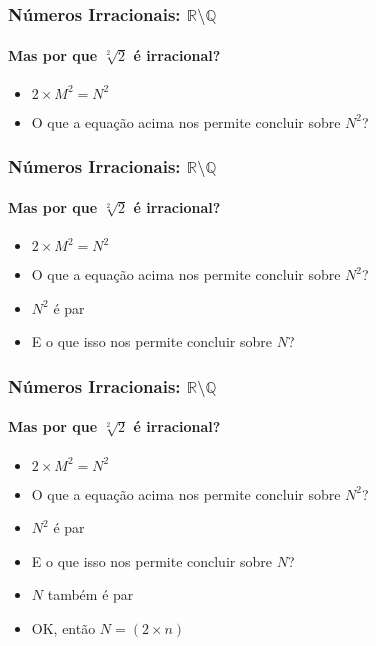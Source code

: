\documentclass[usenames,dvipsnames,svgnames]{beamer}
\begin{document}
\begin{frame}
	
	\frametitle{Números Irracionais: $\mathbb{R} \setminus \mathbb{Q}$}
	\framesubtitle{Mas {\color{red}por que} $\sqrt[2]{2}$ é irracional?}

	\begin{itemize}
		\item $2 \times M^2 = N^2$
		\item O que a equação acima nos permite concluir sobre $N^2$?
	\end{itemize}

\end{frame}

\begin{frame}
	
	\frametitle{Números Irracionais: $\mathbb{R} \setminus \mathbb{Q}$}
	\framesubtitle{Mas {\color{red}por que} $\sqrt[2]{2}$ é irracional?}

	\begin{itemize}
		\item $2 \times M^2 = N^2$
		\item O que a equação acima nos permite concluir sobre $N^2$?
		\item {\color{red} $N^2$ é par}
		\item E o que isso nos permite concluir sobre $N$?
	\end{itemize}

\end{frame}

\begin{frame}
	
	\frametitle{Números Irracionais: $\mathbb{R} \setminus \mathbb{Q}$}
	\framesubtitle{Mas {\color{red}por que} $\sqrt[2]{2}$ é irracional?}

	\begin{itemize}
		\item $2 \times M^2 = N^2$
		\item O que a equação acima nos permite concluir sobre $N^2$?
		\item {\color{red} $N^2$ é par}
		\item E o que isso nos permite concluir sobre $N$?
		\item {\color{red} $N$ também é par}
		\item OK, então $N = (2 \times n)$
	\end{itemize}

\end{frame}
\end{document}
